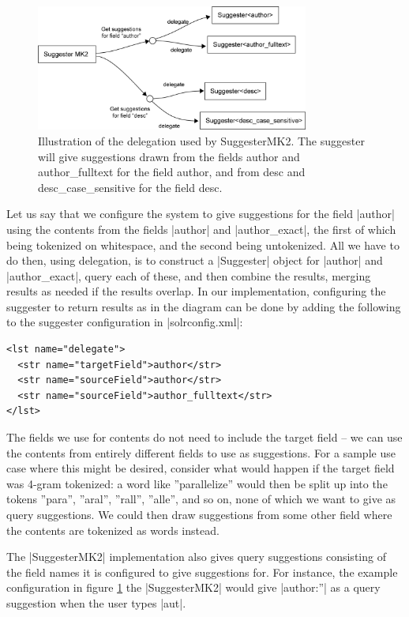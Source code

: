 \begin{figure}[h!]
    \centering
    \includegraphics[width=0.8\textwidth]{img/delegation.png}
    \caption{\footnotesize{Illustration of the delegation used by SuggesterMK2. The suggester will give suggestions drawn from the fields author and author\_fulltext for the field author, and from desc and desc\_case\_sensitive for the field desc.}}
    \label{fig:delegation}
\end{figure}

Let us say that we configure the system to give suggestions for the field |author| using the contents from the fields |author| and |author_exact|, the first of which being tokenized on whitespace, and the second being untokenized. All we have to do then, using delegation, is to construct a |Suggester| object for |author| and |author_exact|, query each of these, and then combine the results, merging results as needed if the results overlap. In our implementation, configuring the suggester to return results as in the diagram can be done by adding the following to the suggester configuration in |solrconfig.xml|:

\begin{verbatim}
<lst name="delegate">
  <str name="targetField">author</str>
  <str name="sourceField">author</str>
  <str name="sourceField">author_fulltext</str>
</lst>
\end{verbatim}

The fields we use for contents do not need to include the target field – we can use the contents from entirely different fields to use as suggestions. For a sample use case where this might be desired, consider what would happen if the target field was 4-gram tokenized: a word like ''parallelize'' would then be split up into the tokens ''para'', ''aral'', ''rall'', ''alle'', and so on, none of which we want to give as query suggestions. We could then draw suggestions from some other field where the contents are tokenized as words instead.

The |SuggesterMK2| implementation also gives query suggestions consisting of the field names it is configured to give suggestions for. For instance, the example configuration in figure \ref{fig:delegation} the |SuggesterMK2| would give |author:”| as a query suggestion when the user types |aut|.

